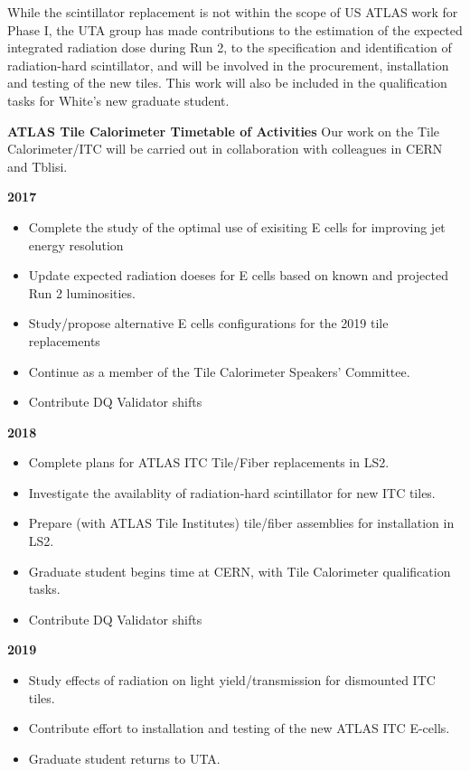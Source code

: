 While the scintillator replacement is not within the scope of US ATLAS work for Phase I, 
the UTA group has made contributions to the estimation of the expected integrated radiation dose during
Run 2, to the specification and identification of radiation-hard
scintillator, and will be involved in the procurement, installation and testing of the new
tiles. This work will also be included in the qualification tasks for White's new graduate student.

\textbf{ATLAS Tile Calorimeter Timetable of Activities}
Our work on the Tile Calorimeter/ITC will be carried out in collaboration with colleagues
in CERN and Tblisi.

\textbf{2017}
\begin{itemize}[noitemsep,nolistsep]
\item{Complete the study of the optimal use of exisiting E cells for improving jet energy resolution}
\item{Update expected radiation doeses for E cells based on known and projected Run 2 luminosities.}
\item{Study/propose alternative E cells configurations for the 2019 tile replacements}
\item{Continue as a member of the Tile Calorimeter Speakers' Committee.}
\item{Contribute DQ Validator shifts}
\end{itemize}

\textbf{2018}
\begin{itemize}[noitemsep,nolistsep]
\item{Complete plans for ATLAS ITC Tile/Fiber replacements in LS2.}
\item{Investigate the availablity of radiation-hard scintillator for new ITC tiles.}
\item{Prepare (with ATLAS Tile Institutes) tile/fiber assemblies for installation in LS2.}
\item{Graduate student begins time at CERN, with Tile Calorimeter qualification tasks.}
\item{Contribute DQ Validator shifts}
\end{itemize}

\textbf{2019}
\begin{itemize}[noitemsep,nolistsep]
\item{Study effects of radiation on light yield/transmission for dismounted ITC tiles.}
\item{Contribute effort to installation and testing of the new ATLAS ITC E-cells.}
\item{Graduate student returns to UTA.}
\end{itemize}